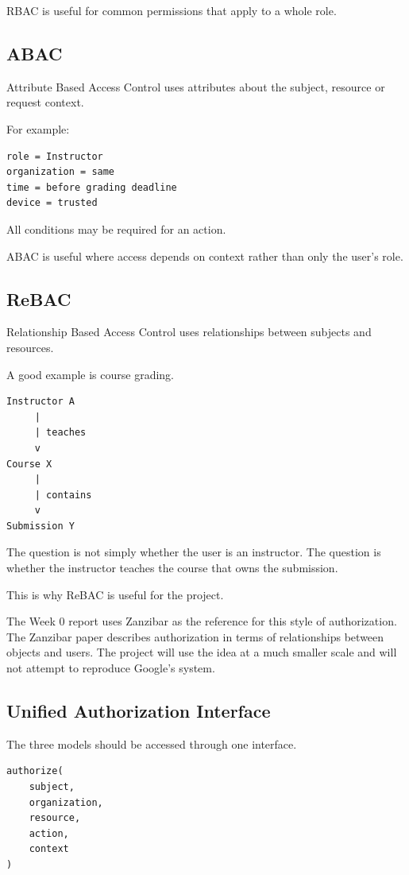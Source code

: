 \documentclass[11pt,a4paper]{article}
\begin{document}
RBAC is useful for common permissions that apply to a whole role.

\subsection{ABAC}

Attribute Based Access Control uses attributes about the subject, resource or request context.

For example:

\begin{verbatim}
role = Instructor
organization = same
time = before grading deadline
device = trusted
\end{verbatim}

All conditions may be required for an action.

ABAC is useful where access depends on context rather than only the user's role.

\subsection{ReBAC}

Relationship Based Access Control uses relationships between subjects and resources.

A good example is course grading.

\begin{verbatim}
Instructor A
     |
     | teaches
     v
Course X
     |
     | contains
     v
Submission Y
\end{verbatim}

The question is not simply whether the user is an instructor. The question is whether the instructor teaches the course that owns the submission.

This is why ReBAC is useful for the project.

The Week 0 report uses Zanzibar as the reference for this style of authorization. The Zanzibar paper describes authorization in terms of relationships between objects and users. The project will use the idea at a much smaller scale and will not attempt to reproduce Google's system.

\subsection{Unified Authorization Interface}

The three models should be accessed through one interface.

\begin{verbatim}
authorize(
    subject,
    organization,
    resource,
    action,
    context
)
\end{verbatim}
\end{document}
